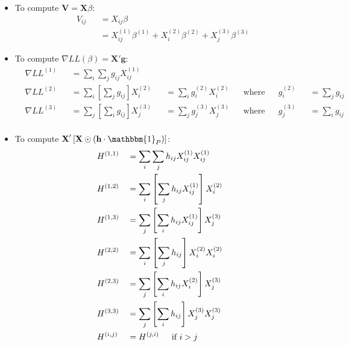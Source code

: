 \documentclass[12pt]{article}
\begin{document}
\begin{itemize}
\item To compute $\textbf{V} = \textbf{X}\beta$:
\begin{equation}
\begin{aligned}
	& V_{ij} && = X_{ij} \beta \\
	& && = X^{(1)}_{ij} \beta^{(1)}  + X^{(2)}_{i} \beta^{(2)} + X^{(3)}_{j} \beta^{(3)}
\end{aligned}
\end{equation}

\item To compute $\nabla LL(\beta) = \textbf{X}' \textbf{g}$:
	\begin{equation}
	\begin{aligned}
		& \nabla LL^{(1)} && = \sum_{i} \sum_{j} g_{ij} X^{(1)}_{ij}			 \\
		& \nabla LL^{(2)} && = \sum_{i} \left[ \sum_{j} g_{ij} \right] X^{(2)}_{i}		&& = \sum_{i}  g^{(2)}_{i} X^{(2)}_{i}			&& \text{where} && g^{(2)}_{i} && = \sum_{j} g_{ij}  \\
		& \nabla LL^{(3)} && = \sum_{j} \left[ \sum_{i} g_{ij} \right] X^{(3)}_{j}		&& = \sum_{j} g^{(3)}_{j} X^{(3)}_{j}			&& \text{where} && g^{(3)}_{j} && = \sum_{i} g_{ij}  \\	\end{aligned}
	\end{equation}

\item To compute $\textbf{X}' \left[ \textbf{X} \odot \left(\textbf{h} \cdot \mathbbm{1}_P \right) \right]$:
	\begin{equation*}
	\begin{aligned}
		& H^{(1,1)} && = \sum_{i} \sum_{j} h_{ij} X^{(1)}_{ij} X^{(1)}_{ij} \\
		& H^{(1,2)} && = \sum_{i} \left[  \sum_{j} h_{ij} X^{(1)}_{ij} \right] X^{(2)}_{i} \\
		& H^{(1,3)} && = \sum_{j} \left[ \sum_{i} h_{ij} X^{(1)}_{ij} \right] X^{(3)}_{j} \\
		& H^{(2,2)} && = \sum_{i} \left[ \sum_{j} h_{ij} \right] X^{(2)}_{i} X^{(2)}_{i} \\
		& H^{(2,3)} && = \sum_{j} \left[ \sum_{i} h_{ij} X^{(2)}_{i} \right] X^{(3)}_{j} \\
		& H^{(3,3)} && = \sum_{j} \left[ \sum_{i} h_{ij} \right] X^{(3)}_{j} X^{(3)}_{j} \\
		& H^{(i,j)} && = H^{(j,i)} \hspace*{15pt} \text{if } i > j \\
	\end{aligned}
	\end{equation*}

\end{itemize}
\end{document}
